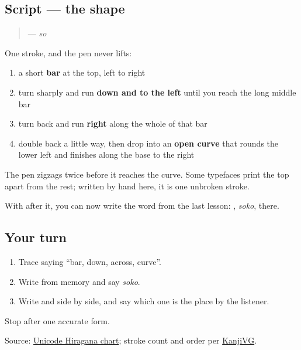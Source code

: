 \subsection*{Script — the shape}

\begin{quote}
\textbf{} — \emph{so}
\end{quote}

One stroke, and the pen never lifts:

\begin{enumerate}
\raggedright
  \item a short \textbf{bar} at the top, left to right
  \item turn sharply and run \textbf{down and to the left} until you reach the long middle bar
  \item turn back and run \textbf{right} along the whole of that bar
  \item double back a little way, then drop into an \textbf{open curve} that rounds the lower left and finishes along the base to the right
\end{enumerate}

The pen zigzags twice before it reaches the curve. Some typefaces print the top apart from the rest; written by hand here, it is one unbroken stroke.

With \textbf{} after it, you can now write the word from the last lesson: \textbf{}, \emph{soko}, there.

\subsection*{Your turn}
\begin{enumerate}
\raggedright
  \item Trace \textbf{} saying \textquotedblleft{}bar, down, across, curve\textquotedblright{}.
  \item Write \textbf{} from memory and say \emph{soko}.
  \item Write \textbf{} and \textbf{} side by side, and say which one is the place by the listener.
\end{enumerate}

\begin{tcolorbox}[breakable,colback=teal!4,colframe=teal!35!black,title={Before you move on}]
Stop after one accurate form.

Source: \href{https://www.unicode.org/charts/PDF/U3040.pdf}{Unicode Hiragana chart}; stroke count and order per \href{https://kanjivg.tagaini.net/kanjivg/kanji/0305d.html}{KanjiVG}.
\end{tcolorbox}
